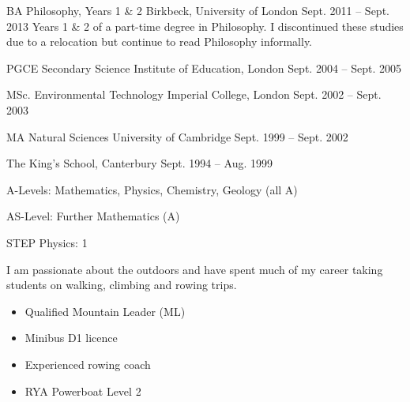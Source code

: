\documentclass[11pt, a4paper]{awesome-cv}
\begin{document}

\begin{cventries}

  \cventry
  {BA Philosophy, Years 1 \& 2} %
  {Birkbeck, University of London} %
  {Sept. 2011 -- Sept. 2013} %
  {} %
  {Years 1 \& 2 of a part-time degree in Philosophy. I discontinued these studies due to a relocation but continue to read Philosophy informally.}

  \cventry
  {PGCE Secondary Science} %
  {Institute of Education, London} %
  {Sept. 2004 -- Sept. 2005} %
  {} %
  {}

  \cventry
  {MSc. Environmental Technology} %
  {Imperial College, London} %
  {Sept. 2002 -- Sept. 2003} %
  {} %
  {}

  \cventry
  {MA Natural Sciences} %
  {University of Cambridge} %
  {Sept. 1999 -- Sept. 2002} %
  {} %
  {}

  \cventry
  {} %
  {The King's School, Canterbury} %
  {Sept. 1994 -- Aug. 1999} %
  {} %
  {\begin{cvitems}
    \item A-Levels: Mathematics, Physics, Chemistry, Geology (all A)
    \item AS-Level: Further Mathematics (A)
    \item STEP Physics: 1
  \end{cvitems}
  }
\end{cventries}



\begin{cvparagraph}
  I am passionate about the outdoors and have spent much of my career taking students on walking, climbing and rowing trips.
  
  \begin{itemize}
    \item Qualified Mountain Leader (ML)
    \item Minibus D1 licence
    \item Experienced rowing coach
    \item RYA Powerboat Level 2
    \end{itemize}
\end{cvparagraph}

\end{document}
